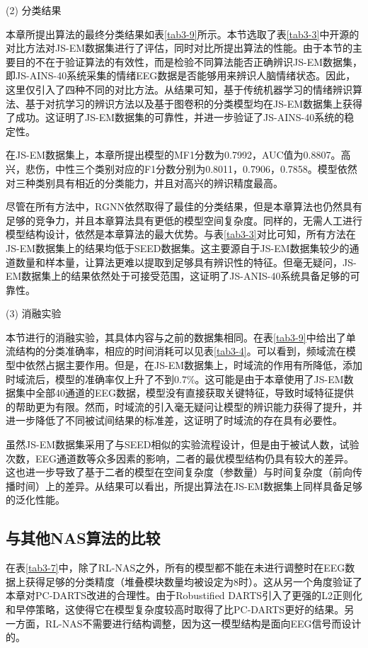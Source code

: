 (2) 分类结果 

本章所提出算法的最终分类结果如表\ref{tab3-9}所示。本节选取了表\ref{tab3-3}中开源的对比方法对JS-EM数据集进行了评估，同时对比所提出算法的性能。由于本节的主要目的不在于验证算法的有效性，而是检验不同算法能否正确辨识JS-EM数据集，即JS-AINS-40系统采集的情绪EEG数据是否能够用来辨识人脑情绪状态。因此，这里仅引入了四种不同的对比方法。从结果可知，基于传统机器学习的情绪辨识算法、基于对抗学习的辨识方法以及基于图卷积的分类模型均在JS-EM数据集上获得了成功。这证明了JS-EM数据集的可靠性，并进一步验证了JS-AINS-40系统的稳定性。

在JS-EM数据集上，本章所提出模型的MF1分数为0.7992，AUC值为0.8807。高兴，悲伤，中性三个类别对应的F1分数分别为0.8011，0.7906，0.7858。模型依然对三种类别具有相近的分类能力，并且对高兴的辨识精度最高。

尽管在所有方法中，RGNN依然取得了最佳的分类结果，但是本章算法也仍然具有足够的竞争力，并且本章算法具有更低的模型空间复杂度。同样的，无需人工进行模型结构设计，依然是本章算法的最大优势。与表\ref{tab3-3}对比可知，所有方法在JS-EM数据集上的结果均低于SEED数据集。这主要源自于JS-EM数据集较少的通道数量和样本量，让算法更难以提取到足够具有辨识性的特征。但毫无疑问，JS-EM数据集上的结果依然处于可接受范围，这证明了JS-ANIS-40系统具备足够的可靠性。

(3) 消融实验

本节进行的消融实验，其具体内容与之前的数据集相同。在表\ref{tab3-9}中给出了单流结构的分类准确率，相应的时间消耗可以见表\ref{tab3-4}。可以看到，频域流在模型中依然占据主要作用。但是，在JS-EM数据集上，时域流的作用有所降低，添加时域流后，模型的准确率仅上升了不到0.7\%。这可能是由于本章使用了JS-EM数据集中全部40通道的EEG数据，模型没有直接获取关键特征，导致时域特征提供的帮助更为有限。然而，时域流的引入毫无疑问让模型的辨识能力获得了提升，并进一步降低了不同被试间结果的标准差，这证明了时域流的存在具有必要性。

虽然JS-EM数据集采用了与SEED相似的实验流程设计，但是由于被试人数，试验次数，EEG通道数等众多因素的影响，二者的最优模型结构仍具有较大的差异。这也进一步导致了基于二者的模型在空间复杂度（参数量）与时间复杂度（前向传播时间）上的差异。从结果可以看出，所提出算法在JS-EM数据集上同样具备足够的泛化性能。


\subsection{与其他NAS算法的比较}

在表\ref{tab3-7}中，除了RL-NAS\cite{3-33}之外，所有的模型都不能在未进行调整时在EEG数据上获得足够的分类精度（堆叠模块数量均被设定为8时）。这从另一个角度验证了本章对PC-DARTS改进的合理性。由于Robustified DARTS\cite{3-36}引入了更强的L2正则化和早停策略，这使得它在模型复杂度较高时取得了比PC-DARTS更好的结果。另一方面，RL-NAS不需要进行结构调整，因为这一模型结构是面向EEG信号而设计的。

